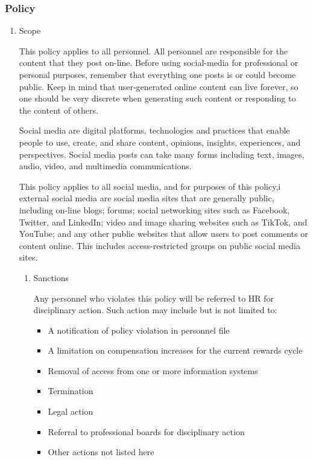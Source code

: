 \documentclass[stu]{apa7}
\begin{document}
\subsubsection{Policy}
\label{sec:orgfa905e0}

\begin{enumerate}
\item Scope
\label{sec:org7359431}

This policy applies to all personnel. All personnel are responsible for the content that they post on-line. Before using social-media for professional or personal purposes, remember that everything one posts is or could become public. Keep in mind that user-generated online content can live forever, so one should be very discrete when generating such content or responding to the content of others.

Social media are digital platforms, technologies and practices that enable people to use, create, and share content, opinions, insights, experiences, and perspectives. Social media posts can take many forms including text, images, audio, video, and multimedia communications.

This policy applies to all social media, and for purposes of this policy,i external social media are social media sites that are generally public, including on-line blogs; forums; social networking sites such as Facebook, Twitter, and LinkedIn; video and image sharing websites such as TikTok, and YouTube; and any other public websites that allow users to post comments or content online. This includes access-restricted groups on public social media sites.

\begin{enumerate}
\item Sanctions
\label{sec:org69945dc}

Any personnel who violates this policy will be referred to HR for disciplinary action. Such action may include but is not limited to:

\begin{itemize}
\item A notification of policy violation in personnel file
\item A limitation on compensation increases for the current rewards cycle
\item Removal of access from one or more information systems
\item Termination
\item Legal action
\item Referral to professional boards for disciplinary action
\item Other actions not listed here
\end{itemize}
\end{enumerate}


\end{enumerate}
\end{document}
